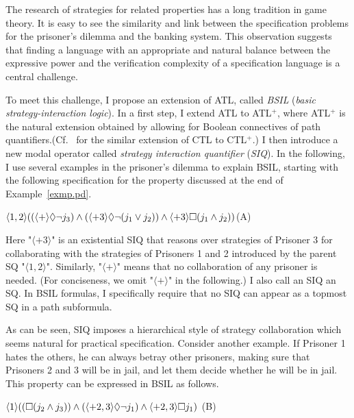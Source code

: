 The research of strategies for related properties has a long tradition in game theory.  
It is easy to see the similarity and link between the specification problems for the prisoner's dilemma and the banking system.
This observation suggests that finding a language with an appropriate and natural balance between the expressive power and the verification complexity of a specification language is a central challenge.

To meet this challenge, I propose an extension of ATL, called {\em BSIL} ({\em basic strategy-interaction logic}).
In a first step, I extend ATL to ATL$^+$, where ATL$^+$ is the natural extension obtained by allowing for Boolean connectives of path quantifiers.(Cf.~\cite{BPM83,EC80} for the similar extension of CTL to CTL$^+$.)
I then introduce a new modal operator called {\em strategy interaction quantifier} ({\em SIQ}). 
In the following, I use several examples in the prisoner's dilemma to explain BSIL, starting with the following specification for the property discussed at the end of Example~\ref{exmp.pd}. 
\begin{center} 
\hfill $\langle 1,2\rangle((\langle+\rangle\Diamond\neg j_3)\wedge 
	(\langle +3\rangle \Diamond\neg (j_1\vee j_2))
	\wedge \langle+3\rangle \Box (j_1\wedge j_2))
$\hfill (A) 
\end{center} 
Here "$\langle+3\rangle$" is an existential SIQ that reasons over 
strategies of Prisoner 3 for collaborating with the strategies  
of Prisoners 1 and 2 introduced by the parent SQ "$\langle 1,2\rangle$". 
Similarly, "$\langle+\rangle$" means that 
no collaboration of any prisoner is needed. 
(For conciseness, we omit "$\langle+\rangle$" in the following.)  \label{reply1.null.siq1} 
I also call an SIQ an SQ.  
In BSIL formulas, I specifically require that no SIQ can appear as a topmost SQ in a path subformula.  

As can be seen, SIQ imposes a hierarchical style of strategy collaboration which seems natural for practical specification.  
Consider another example.
If Prisoner 1 hates the others, he can always betray other prisoners, making sure that Prisoners 2 and 3 will be in jail, and let them decide whether he will be in jail.  
This property can be expressed in BSIL as follows. 
\begin{center} 
\hfill 
$\langle 1\rangle((\Box (j_2\wedge j_3))\wedge 
	(\langle +2,3\rangle \Diamond\neg j_1)
	\wedge \langle+2,3\rangle \Box j_1)
$
\hfill (B) 
\end{center} 

